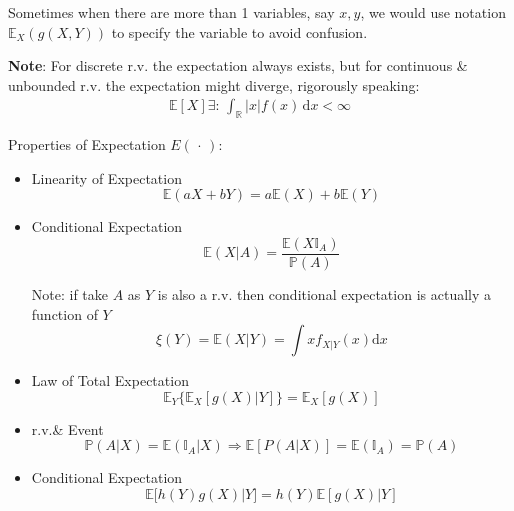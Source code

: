     Sometimes when there are more than 1 variables, say $ x,y $, we would use notation $ \mathbb{E}_X\left( g(X,Y) \right)  $ to specify the variable to avoid confusion.

    \textbf{Note}: For discrete r.v. the expectation always exists, but for continuous \& unbounded r.v. the expectation might diverge, rigorously speaking:
    \begin{align}
        \mathbb{E}\left[ X \right]\exists:\, \int_{\mathbb{R}}|x|f(x)\,\mathrm{d}x<\infty  
    \end{align}
    
    
 
\begin{point}
    Properties of Expectation $E(\,\cdot\,)$:
\end{point}

\begin{itemize}
    \item Linearity of Expectation\begin{equation}
        \mathbb{E}(aX+bY)=a \mathbb{E}(X)+b\mathbb{E}(Y)
    \end{equation}
    \item Conditional Expectation\begin{equation}
        \mathbb{E}(X|A)=\frac{\mathbb{E}(X\mathbb{I}_A)}{\mathbb{P}(A)}
    \end{equation}
    
    Note: if take $A$ as $Y$ is also a r.v. then conditional expectation is actually a function of $Y$
    \begin{equation}\xi (Y)=\mathbb{E}(X|Y)=\int xf_{X|Y}(x)\mathrm{d}x\end{equation}

    

    \item Law of Total Expectation\begin{equation}
        \mathbb{E}_Y\big\{\mathbb{E}_X[g(X)|Y]\big\}=\mathbb{E}_X[g(X)]
    \end{equation}
    \item r.v.\& Event
    \begin{equation}
        \mathbb{P}(A|X)=\mathbb{E}(\mathbb{I}_A|X)\Rightarrow \mathbb{E}[P(A|X)]=\mathbb{E}(\mathbb{I}_A)=\mathbb{P}(A)
    \end{equation}
    \item Conditional Expectation
    \begin{equation}
        \mathbb{E}\big[h(Y)g(X)|Y\big]=h(Y)\mathbb{E}[g(X)|Y]
    \end{equation}
\end{itemize}


